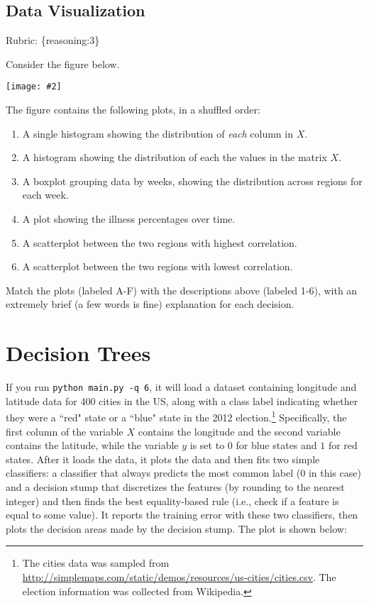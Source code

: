 \documentclass{article}
\def\rubric#1{\gre{Rubric: \{#1\}}}{}
\def\blu#1{{\color{blu}#1}}
\def\gre#1{{\color{gre}#1}}
\newcommand{\fig}[2]{\texttt{[image: \#2]}}
\def\enum#1{\begin{enumerate}#1\end{enumerate}}
\begin{document}
\subsection{Data Visualization}
\rubric{reasoning:3}

Consider the figure below.

\fig{1}{../figs/visualize-unlabeled}

The figure contains the following plots, in a shuffled order:
\enum{
\item A single histogram showing the distribution of \emph{each} column in $X$.
\item A histogram showing the distribution of each the values in the matrix $X$.
\item A boxplot grouping data by weeks, showing the distribution across regions for each week.
\item A plot showing the illness percentages over time.
\item A scatterplot between the two regions with highest correlation.
\item A scatterplot between the two regions with lowest correlation.
}

\blu{Match the plots (labeled A-F) with the descriptions above (labeled 1-6), with an extremely brief (a few words is fine) explanation for each decision.}



\section{Decision Trees}

If you run \texttt{python main.py -q 6}, it will load a dataset containing longitude 
and latitude data for 400 cities in the US, along with a class label indicating
 whether they were a ``red" state or a ``blue" state in the 2012 
 election.\footnote{The cities data was sampled from \url{http://simplemaps.com/static/demos/resources/us-cities/cities.csv}. The election information was collected from Wikipedia.}
Specifically, the first column of the variable $X$ contains the 
longitude and the second variable contains the latitude,
while the variable $y$ is set to $0$ for blue states and $1$ for red states.
After it loads the data, it plots the data and then fits two simple 
classifiers: a classifier that always predicts the
most common label ($0$ in this case) and a decision stump
that discretizes the features (by rounding to the nearest integer)
and then finds the best equality-based rule (i.e., check
 if a feature is equal to some value).
It reports the training error with these two classifiers, then plots the decision areas made by the decision stump.
The plot is shown below:
\end{document}

